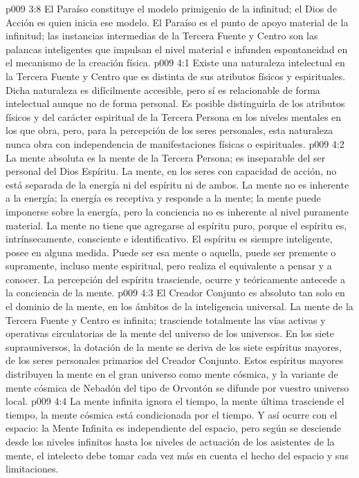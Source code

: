 \vs p009 3:8 El Paraíso constituye el modelo primigenio de la infinitud; el Dios de Acción es quien inicia ese modelo. El Paraíso es el punto de apoyo material de la infinitud; las instancias intermedias de la Tercera Fuente y Centro son las palancas inteligentes que impulsan el nivel material e infunden espontaneidad en el mecanismo de la creación física.
\vs p009 4:1 Existe una naturaleza intelectual en la Tercera Fuente y Centro que es distinta de sus atributos físicos y espirituales. Dicha naturaleza es difícilmente accesible, pero sí es relacionable de forma intelectual aunque no de forma personal. Es posible distinguirla de los atributos físicos y del carácter espiritual de la Tercera Persona en los niveles mentales en los que obra, pero, para la percepción de los seres personales, esta naturaleza nunca obra con independencia de manifestaciones físicas o espirituales.
\vs p009 4:2 La mente absoluta es la mente de la Tercera Persona; es inseparable del ser personal del Dios Espíritu. La mente, en los seres con capacidad de acción, no está separada de la energía ni del espíritu ni de ambos. La mente no es inherente a la energía; la energía es receptiva y responde a la mente; la mente puede imponerse sobre la energía, pero la conciencia no es inherente al nivel puramente material. La mente no tiene que agregarse al espíritu puro, porque el espíritu es, intrínsecamente, consciente e identificativo. El espíritu es siempre inteligente, posee  en alguna medida. Puede ser esa mente o aquella, puede ser premente o supramente, incluso mente espiritual, pero realiza el equivalente a pensar y a conocer. La percepción del espíritu trasciende, ocurre y teóricamente antecede a la conciencia de la mente.
\vs p009 4:3 \pc El Creador Conjunto es absoluto tan solo en el dominio de la mente, en los ámbitos de la inteligencia universal. La mente de la Tercera Fuente y Centro es infinita; trasciende totalmente las vías activas y operativas circulatorias de la mente del universo de los universos. En los siete suprauniversos, la dotación de la mente se deriva de los siete espíritus mayores, de los seres personales primarios del Creador Conjunto. Estos espíritus mayores distribuyen la mente en el gran universo como mente cósmica, y la variante de mente cósmica de Nebadón del tipo de Orvontón se difunde por vuestro universo local.
\vs p009 4:4 La mente infinita ignora el tiempo, la mente última trasciende el tiempo, la mente cósmica está condicionada por el tiempo. Y así ocurre con el espacio: la Mente Infinita es independiente del espacio, pero según se desciende desde los niveles infinitos hasta los niveles de actuación de los asistentes de la mente, el intelecto debe tomar cada vez más en cuenta el hecho del espacio y sus limitaciones.
